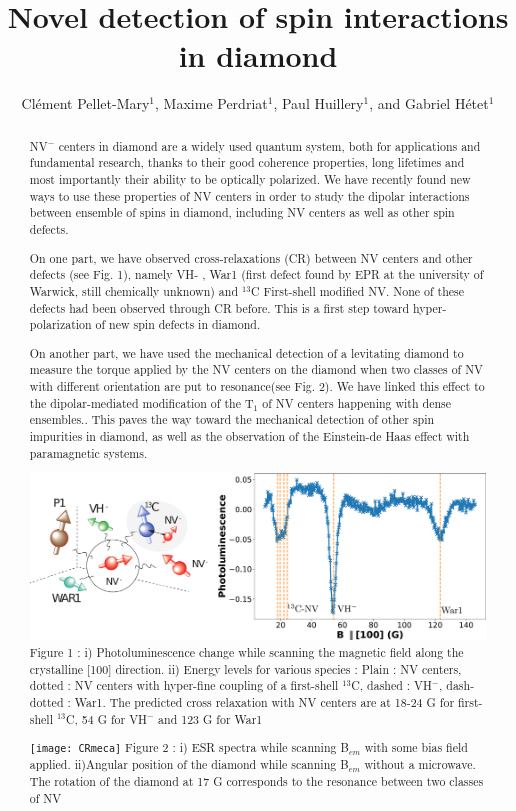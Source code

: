 \documentclass[aps,twocolumn,showpacs]{revtex4-1}
\begin{document}
\title{Novel detection of spin interactions in diamond}

\author{Clément Pellet-Mary$^1$, Maxime Perdriat$^1$, Paul Huillery$^1$, and Gabriel Hétet$^{1}$}

\begin{abstract}
\normalsize
NV$^-$ centers in diamond are a widely used quantum system, both for applications and fundamental research, thanks to their good coherence properties, long lifetimes and most importantly their ability to be optically polarized.
We have recently found new ways to use these properties of NV centers in order to study the dipolar interactions between ensemble of spins in diamond, including NV centers as well as other spin defects. 

On one part, we have observed cross-relaxations (CR) between NV centers and other defects (see Fig. 1), namely VH- \cite{VH}, War1 (first defect found by EPR at the university of Warwick, still chemically unknown) and $^{13}$C First-shell modified NV. None of these defects had been observed through CR before. This is a first step toward hyper-polarization of new spin defects in diamond.

On another part, we have used the mechanical detection of a levitating diamond to measure the torque applied by the NV centers on the diamond when two classes of NV with different orientation are put to resonance(see Fig. 2). We have linked this effect to the dipolar-mediated modification of the T$_1$ of NV centers happening with dense ensembles.\cite{Lukin}. This paves the way toward the mechanical detection of other spin impurities in diamond, as well as the observation of the Einstein-de Haas effect with paramagnetic systems. \cite{Meriles}

\includegraphics[scale=.25]{CR_total}
Figure 1 : i) Photoluminescence change while scanning the magnetic field along the crystalline [100] direction. ii) Energy levels for various species : Plain : NV centers, dotted : NV centers with hyper-fine coupling of a first-shell $^{13}$C, dashed : VH$^-$, dash-dotted : War1. The predicted cross relaxation with NV centers are at 18-24 G for first-shell $^{13}$C, 54 G for VH$^-$ and 123 G for War1

\texttt{[image: CRmeca]}
Figure 2 : i) ESR spectra while scanning B$_{em}$ with some bias field applied. ii)Angular position of the diamond while scanning B$_{em}$ without a microwave. The rotation of the diamond at 17 G corresponds to the resonance between two classes of NV
\end{abstract}
\end{document}
